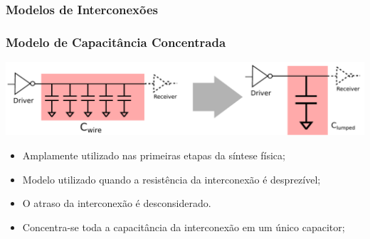 \documentclass[10pt,a4paper]{beamer}
\begin{document}
			\subsubsection*{Modelos de Interconexões}
%					
%					
				
				\begin{frame}
					\frametitle{Modelo de Capacitância Concentrada}
					\begin{center}
						\includegraphics[width=\textwidth]{img/lumped_c.pdf} 
					\end{center}
					\begin{itemize}
						\item Amplamente utilizado nas primeiras etapas da síntese física;
						\item Modelo utilizado quando a resistência da interconexão é desprezível;
						\item O atraso da interconexão é desconsiderado.
						\item Concentra-se toda a capacitância da interconexão em um único capacitor;
					\end{itemize}							
				\end{frame}
				
\end{document}
